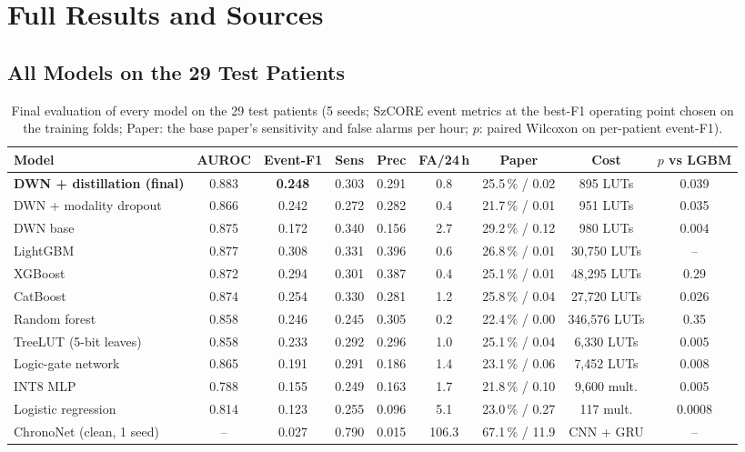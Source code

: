 \chapter{Full Results and Sources}\label{app:sources}

\section{All Models on the 29 Test Patients}

\begin{table}[htbp]
\centering\footnotesize
\caption[Final evaluation of every model on the 29 test patients.]{Final evaluation of every model on the 29 test patients (5 seeds; SzCORE event metrics at the best-F1
operating point chosen on the training folds; Paper: the base paper's sensitivity and false alarms per hour; $p$: paired
Wilcoxon on per-patient event-F1).}\label{tab:test-full}
\setlength{\tabcolsep}{2pt}
\begin{tabular}{@{}lcccccccc@{}}
\toprule
\textbf{Model} & \textbf{AUROC} & \textbf{Event-F1} & \textbf{Sens} & \textbf{Prec} & \textbf{FA/24\,h} &
\textbf{Paper} & \textbf{Cost} & \textbf{$p$ vs LGBM}\\
\midrule
\textbf{DWN + distillation (final)} & 0.883 & \textbf{0.248} & 0.303 & 0.291 & 0.8 & 25.5\,\% / 0.02 & 895 LUTs & 0.039\\
DWN + modality dropout & 0.866 & 0.242 & 0.272 & 0.282 & 0.4 & 21.7\,\% / 0.01 & 951 LUTs & 0.035\\
DWN base & 0.875 & 0.172 & 0.340 & 0.156 & 2.7 & 29.2\,\% / 0.12 & 980 LUTs & 0.004\\
LightGBM & 0.877 & 0.308 & 0.331 & 0.396 & 0.6 & 26.8\,\% / 0.01 & 30,750 LUTs & --\\
XGBoost & 0.872 & 0.294 & 0.301 & 0.387 & 0.4 & 25.1\,\% / 0.01 & 48,295 LUTs & 0.29\\
CatBoost & 0.874 & 0.254 & 0.330 & 0.281 & 1.2 & 25.8\,\% / 0.04 & 27,720 LUTs & 0.026\\
Random forest & 0.858 & 0.246 & 0.245 & 0.305 & 0.2 & 22.4\,\% / 0.00 & 346,576 LUTs & 0.35\\
TreeLUT (5-bit leaves) & 0.858 & 0.233 & 0.292 & 0.296 & 1.0 & 25.1\,\% / 0.04 & 6,330 LUTs & 0.005\\
Logic-gate network & 0.865 & 0.191 & 0.291 & 0.186 & 1.4 & 23.1\,\% / 0.06 & 7,452 LUTs & 0.008\\
INT8 MLP & 0.788 & 0.155 & 0.249 & 0.163 & 1.7 & 21.8\,\% / 0.10 & 9,600 mult. & 0.005\\
Logistic regression & 0.814 & 0.123 & 0.255 & 0.096 & 5.1 & 23.0\,\% / 0.27 & 117 mult. & 0.0008\\
ChronoNet (clean, 1 seed) & -- & 0.027 & 0.790 & 0.015 & 106.3 & 67.1\,\% / 11.9 & CNN + GRU & --\\
\bottomrule
\end{tabular}
\end{table}


